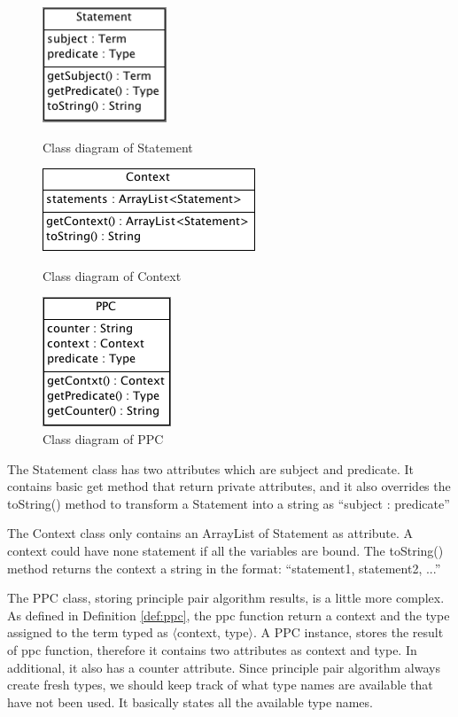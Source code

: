 \begin{figure}[ht]
\centering
\begin{minipage}{.3\textwidth}
\centering
\includegraphics[scale=0.6]{pics/Statement}
\caption{Class diagram of Statement}
\label{fig:statement}
\end{minipage}\hfill
\begin{minipage}{.3\textwidth}
\centering
\includegraphics[scale=0.6]{pics/Context}
\caption{Class diagram of Context}
\label{fig:context}
\end{minipage}\hfill
\begin{minipage}{.3\textwidth}
\centering
\includegraphics[scale=0.5]{pics/PPC}
\caption{Class diagram of PPC}
\label{fig:ppc}
\end{minipage}
\end{figure}

The \textsf{Statement} class has two attributes which are subject and predicate. It contains basic get method that return \textsf{private} attributes, and it also overrides the \textsf{toString()} method to transform a \textsf{Statement} into a string as ``subject : predicate''

The \textsf{Context} class only contains an \textsf{ArrayList} of \textsf{Statement} as attribute. A context could have none statement if all the variables are bound. The \textsf{toString()} method returns the context a string in the format: ``statement1, statement2, ...'' 

The \textsf{PPC} class, storing principle pair algorithm results, is a little more complex. As defined in Definition \ref{def:ppc}, the ppc function return a context and the type assigned to the term typed as $\langle$context, type$\rangle$. A PPC instance, stores the result of ppc function, therefore it contains two attributes as context and type. In additional, it also has a counter attribute. Since principle pair algorithm always create \textsf{fresh} types, we should keep track of what type names are available that have not been used. It basically states all the available type names.   


